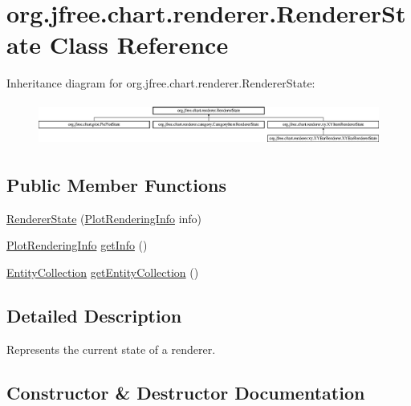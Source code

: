 \hypertarget{classorg_1_1jfree_1_1chart_1_1renderer_1_1_renderer_state}{}\section{org.\+jfree.\+chart.\+renderer.\+Renderer\+State Class Reference}
\label{classorg_1_1jfree_1_1chart_1_1renderer_1_1_renderer_state}
Inheritance diagram for org.\+jfree.\+chart.\+renderer.\+Renderer\+State\+:\begin{figure}[H]
\begin{center}
\leavevmode
\includegraphics[height=1.432225cm]{classorg_1_1jfree_1_1chart_1_1renderer_1_1_renderer_state}
\end{center}
\end{figure}
\subsection*{Public Member Functions}
\begin{DoxyCompactItemize}
\item 
\mbox{\hyperlink{classorg_1_1jfree_1_1chart_1_1renderer_1_1_renderer_state_ac005439326ba5882bf5b7cb2c9d26dae}{Renderer\+State}} (\mbox{\hyperlink{classorg_1_1jfree_1_1chart_1_1plot_1_1_plot_rendering_info}{Plot\+Rendering\+Info}} info)
\item 
\mbox{\hyperlink{classorg_1_1jfree_1_1chart_1_1plot_1_1_plot_rendering_info}{Plot\+Rendering\+Info}} \mbox{\hyperlink{classorg_1_1jfree_1_1chart_1_1renderer_1_1_renderer_state_a2f09d95b11e2ded110f0e3a3393ba0c4}{get\+Info}} ()
\item 
\mbox{\hyperlink{interfaceorg_1_1jfree_1_1chart_1_1entity_1_1_entity_collection}{Entity\+Collection}} \mbox{\hyperlink{classorg_1_1jfree_1_1chart_1_1renderer_1_1_renderer_state_ab0b6645c5a83ab1fcc1bbc5c59f111e6}{get\+Entity\+Collection}} ()
\end{DoxyCompactItemize}


\subsection{Detailed Description}
Represents the current state of a renderer. 

\subsection{Constructor \& Destructor Documentation}
\mbox{\label{classorg_1_1jfree_1_1chart_1_1renderer_1_1_renderer_state_ac005439326ba5882bf5b7cb2c9d26dae}} 
